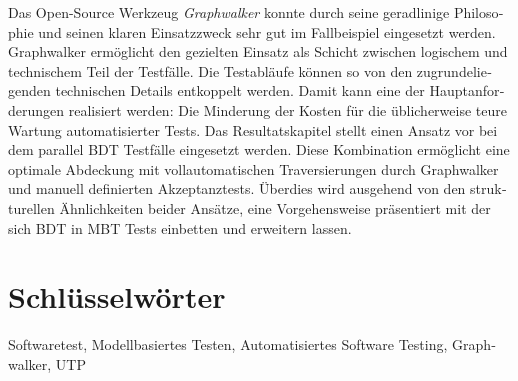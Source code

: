 \begin{otherlanguage}{ngerman}
Das Open-Source Werkzeug \textit{Graphwalker} konnte durch seine geradlinige Philosophie und seinen klaren Einsatzzweck sehr gut im Fallbeispiel eingesetzt werden. Graphwalker ermöglicht den gezielten Einsatz als Schicht zwischen logischem und technischem Teil der Testfälle. Die Testabläufe können so von den zugrundeliegenden technischen Details entkoppelt werden. Damit kann eine der Hauptanforderungen realisiert werden: Die Minderung der Kosten für die üblicherweise teure Wartung automatisierter Tests. Das Resultatskapitel stellt einen Ansatz vor bei dem parallel \Gls{BDT} Testfälle eingesetzt werden. Diese Kombination ermöglicht eine optimale Abdeckung mit vollautomatischen Traversierungen durch Graphwalker und manuell definierten Akzeptanztests. Überdies wird ausgehend von den strukturellen Ähnlichkeiten beider Ansätze, eine Vorgehensweise präsentiert mit der sich \Gls{BDT} in \Gls{MBT} Tests einbetten und erweitern lassen.

\bigskip

  \section*{Schlüsselwörter}
  Softwaretest, Modellbasiertes Testen, Automatisiertes Software Testing, Graphwalker, UTP

\end{otherlanguage}


